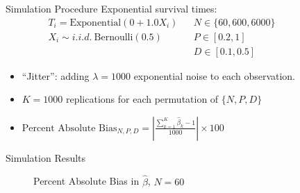 \documentclass[structurebold,final,hyperref=pdftex,bookmarks,colorlinks,breaklinks]{beamer}
\begin{document}
\begin{frame}
\begin{columns}[t]
\begin{column}{0.24\linewidth}
    \end{column}%

    \begin{column}{0.24\linewidth}


      \begin{block}{Simulation Procedure}
      \noindent Exponential survival times:
               \begin{align*}
               T_{i} = \text{Exponential}(0 + 1.0 X_{i})       &  & N \in \{60,600,6000\} \\
                X_{i} \sim i.i.d.\ \text{Bernoulli}(0.5)            & & P \in [0.2,1]  \\
                                                                                   & & D \in [0.1,0.5]
          \end{align*}
      \begin{itemize}
      \item ``Jitter'': adding $\lambda=1000$ exponential noise to each observation.
      \item $K = 1000$ replications for each permutation of $\{N,P,D\}$
      \item $\text{Percent Absolute Bias}_{N,P,D} = \left| \frac{\sum_{k=1}^{K} \hat{\beta}_{k} - 1}{1000} \right| \times 100$
      \end{itemize}
      \end{block}


      \begin{block}{Simulation Results}

        \begin{figure}[h]
        \begin{center}
        Percent Absolute Bias in $\hat{\beta}$, $N=60$ \\
        \end{center}
        \end{figure}


\end{block}
\end{column}
\end{columns}
\end{frame}
\end{document}
